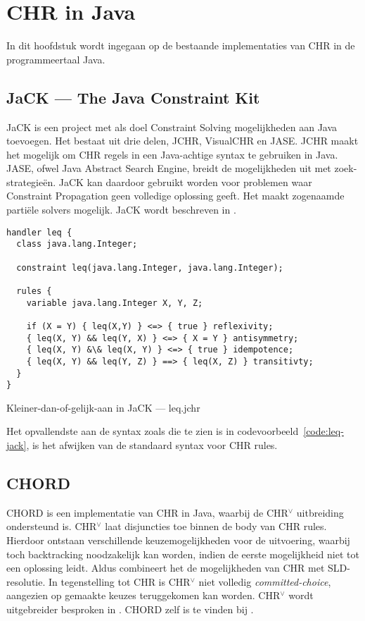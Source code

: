 \chapter{CHR in Java} \label{chap:chr-java}

In dit hoofdstuk wordt ingegaan op de bestaande implementaties van CHR in de programmeertaal Java. 

\section{JaCK --- The Java Constraint Kit}

JaCK is een project met als doel Constraint Solving mogelijkheden aan Java toevoegen. Het bestaat uit drie delen, JCHR, VisualCHR en JASE. JCHR maakt het mogelijk om CHR regels in een Java-achtige syntax te gebruiken in Java. JASE, ofwel Java Abstract Search Engine, breidt de mogelijkheden uit met zoek-strategie\"en. JaCK kan daardoor gebruikt worden voor problemen waar Constraint Propagation geen volledige oplossing geeft. Het maakt zogenaamde parti\"ele solvers mogelijk. JaCK wordt beschreven in \cite{jack}.
\begin{exCode}[bhp]
\begin{Verbatim}[frame=single]
handler leq {
  class java.lang.Integer;
  
  constraint leq(java.lang.Integer, java.lang.Integer);
  
  rules {
    variable java.lang.Integer X, Y, Z;
    
    if (X = Y) { leq(X,Y) } <=> { true } reflexivity;
    { leq(X, Y) && leq(Y, X) } <=> { X = Y } antisymmetry;
    { leq(X, Y) &\& leq(X, Y) } <=> { true } idempotence;
    { leq(X, Y) && leq(Y, Z) } ==> { leq(X, Z) } transitivty;
  }
}
\end{Verbatim}
\caption{Kleiner-dan-of-gelijk-aan in JaCK --- leq.jchr}
\label{code:leq-jack}
\end{exCode}
Het opvallendste aan de syntax zoals die te zien is in codevoorbeeld~\ref{code:leq-jack}, is het afwijken van de standaard syntax voor CHR rules.

\section{CHORD}

CHORD is een implementatie van CHR in Java, waarbij de CHR$^\vee$ uitbreiding ondersteund is. CHR$^\vee$ laat disjuncties toe binnen de body van CHR rules. Hierdoor ontstaan verschillende keuzemogelijkheden voor de uitvoering, waarbij toch backtracking noodzakelijk kan worden, indien de eerste mogelijkheid niet tot een oplossing leidt. Aldus combineert het de mogelijkheden van CHR met SLD-resolutie. In tegenstelling tot CHR is CHR$^\vee$ niet volledig {\em committed-choice}, aangezien op gemaakte keuzes teruggekomen kan worden. CHR$^\vee$ wordt uitgebreider besproken in \cite{chrv}. CHORD zelf is te vinden bij \cite{chord}.

